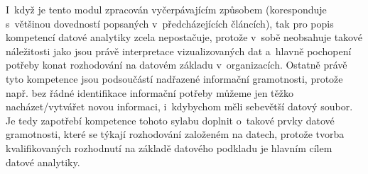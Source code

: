I~když je tento modul zpracován vyčerpávajícím způsobem (koresponduje s~většinou dovedností popsaných v~předcházejících článcích), tak pro popis kompetencí datové analytiky zcela nepostačuje, protože v~sobě neobsahuje takové náležitosti jako jsou právě interpretace vizualizovaných dat a~hlavně pochopení potřeby konat rozhodování na datovém základu v~organizacích. Ostatně právě tyto kompetence jsou podsoučástí nadřazené informační gramotnosti, protože např. bez řádné identifikace informační potřeby můžeme jen těžko nacházet/vytvářet novou informaci, i~kdybychom měli sebevětší datový soubor. Je tedy zapotřebí kompetence tohoto sylabu doplnit o~takové prvky datové gramotnosti, které se týkají rozhodování založeném na datech, protože tvorba kvalifikovaných rozhodnutí na základě datového podkladu je hlavním cílem datové analytiky.
